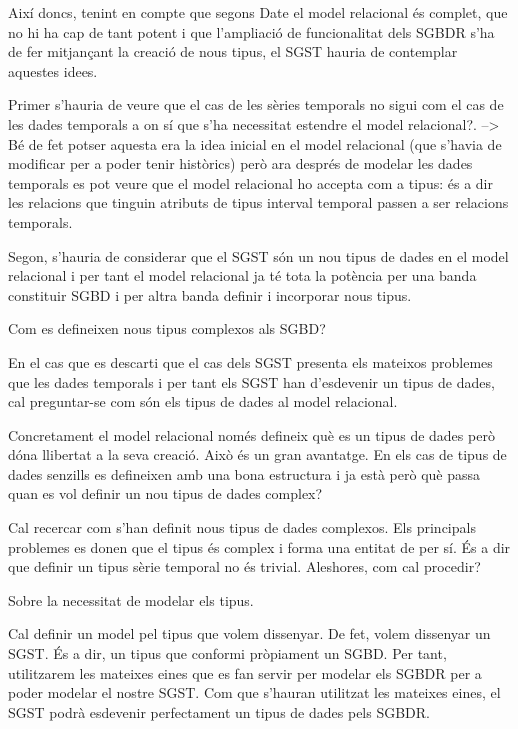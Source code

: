 Així doncs, tenint en compte que segons Date el model relacional és complet, que no hi ha cap de tant potent i que l'ampliació de funcionalitat dels SGBDR s'ha de fer mitjançant la creació de nous tipus, el SGST hauria de contemplar aquestes idees. 

Primer s'hauria de veure que el cas de les sèries temporals no sigui com el cas de les dades temporals a on sí que s'ha necessitat estendre el model relacional?. --> Bé de fet potser aquesta era la idea inicial en el model relacional (que s'havia de modificar per a poder tenir històrics) però ara després de modelar les dades temporals es pot veure que el model relacional ho accepta com a tipus: és a dir les relacions que tinguin atributs de tipus interval temporal passen a ser relacions temporals.

Segon, s'hauria de considerar que el SGST són un nou tipus de dades en el model relacional i per tant el model relacional ja té tota la potència per una banda constituir SGBD i per altra banda definir i incorporar nous tipus.


Com es defineixen nous tipus complexos als SGBD?

En el cas que es descarti que el cas dels SGST presenta els mateixos problemes que les dades temporals i per tant els SGST han d'esdevenir un tipus de dades, cal preguntar-se com són els tipus de dades al model relacional.

Concretament el model relacional només defineix què es un tipus de dades però dóna llibertat a la seva creació. Això és un gran avantatge. En els cas de tipus de dades senzills es defineixen amb una bona estructura i ja està però què passa quan es vol definir un nou tipus de dades complex?

Cal recercar com s'han definit nous tipus de dades complexos. Els principals problemes es donen que el tipus és complex i forma una entitat de per sí. És a dir que definir un tipus sèrie temporal no és trivial. Aleshores, com cal procedir?



Sobre la necessitat de modelar els tipus.

Cal definir un model pel tipus que volem dissenyar.
De fet, volem dissenyar un SGST. És a dir, un tipus que conformi pròpiament un SGBD. Per tant, utilitzarem les mateixes eines que es fan servir per modelar els SGBDR per a poder modelar el nostre SGST. Com que s'hauran utilitzat les mateixes eines, el SGST podrà esdevenir perfectament un tipus de dades pels SGBDR.

